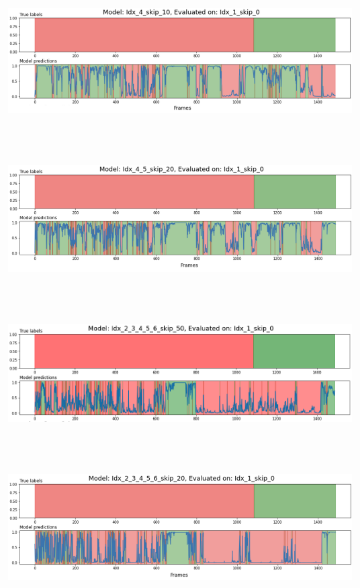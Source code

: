 \begin{figure}[H]
	\centering
	\begin{subfigure}{\linewidth}
		\centering
		\includegraphics[width=\linewidth]{Materials/Results/SP/M1On1C}
	\end{subfigure}
	\\
	\begin{subfigure}{\linewidth}
		\centering
		\includegraphics[width=\linewidth]{Materials/Results/SP/M2On1C}
	\end{subfigure}
	\\
	\begin{subfigure}{\linewidth}
		\centering
		\includegraphics[width=\linewidth]{Materials/Results/SP/M3On1C}
	\end{subfigure}
	\\
	\begin{subfigure}{\linewidth}
		\centering
		\includegraphics[width=\linewidth]{Materials/Results/SP/M4On1C}

\end{subfigure}
\end{figure}
